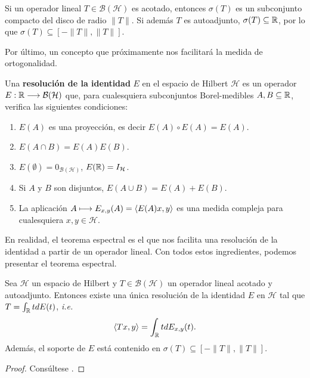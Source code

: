     Si un operador lineal $T\in\mathcal{B}(\mathcal{H})$ es acotado, entonces $\sigma(T)$ es un subconjunto compacto del disco de radio $\|T\|$. Si además $T$ es autoadjunto, $\sigma(T)\subseteq\mathbb{R}$, por lo que $\sigma(T)\subseteq[-\|T\|,\|T\|]$.
    

    Por último, un concepto que próximamente nos facilitará la medida de ortogonalidad.
    
    \begin{definicion}
        \label{def:resolucion-identidad}
        Una \textbf{resolución de la identidad} $E$ en el espacio de Hilbert $\mathcal{H}$ es un operador $E:\mathbb{R}\longrightarrow\mathcal{B}(\mathcal{H})$ que, para cualesquiera subconjuntos Borel-medibles $A,B\subseteq \mathbb{R}$, verifica las siguientes condiciones:
        \begin{enumerate}
            \item $E(A)$ es una proyección, es decir $E(A)\circ E(A)=E(A)$.
            \item $E(A\cap B)=E(A)E(B)$.
            \item $E(\emptyset)=0_{\mathcal{B}(\mathcal{H})}$, $E(\mathbb{R})=I_\mathcal{H}$.
            \item Si $A$ y $B$ son disjuntos, $E(A\cup B)=E(A)+E(B)$.
            \item La aplicación $A\longmapsto E_{x,y}(A)=\left\langle E(A)x , y \right\rangle$ es una medida compleja para cualesquiera $x,y\in\mathcal{H}$.
        \end{enumerate}
    \end{definicion}

    En realidad, el teorema espectral es el que nos facilita una resolución de la identidad a partir de un operador lineal. Con todos estos ingredientes, podemos presentar el teorema espectral.

    \begin{teorema}
        \label{th:espectral}

        Sea $\mathcal{H}$ un espacio de Hilbert y $T\in\mathcal{B}(\mathcal{H})$ un operador lineal acotado y autoadjunto. Entonces existe una única resolución de la identidad $E$ en $\mathcal{H}$ tal que $T=\int_{\mathbb{R}} t dE(t)$, \textit{i.e.}
        \begin{equation}
            \label{eq:teorema-espectral}
            \left\langle Tx , y \right\rangle = \int_{\mathbb{R}} t dE_{x,y}(t).
        \end{equation}
        Además, el soporte de $E$ está contenido en $\sigma(T)\subseteq[-\|T\|,\|T\|]$.
    \end{teorema}
    \begin{proof}
        Consúltese \cite[Theorem 12.22]{rudin}.
    \end{proof}


